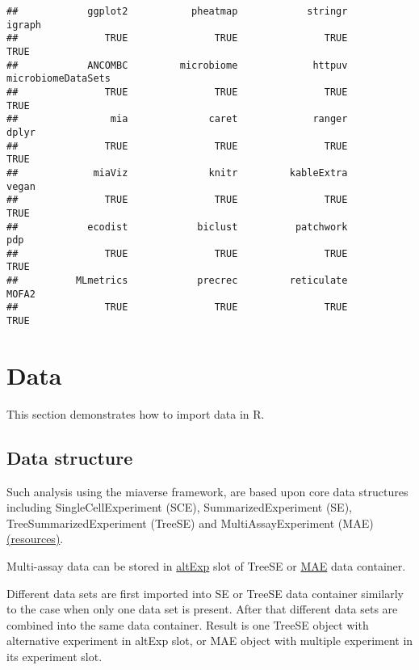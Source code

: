 \documentclass[
  oneside]{book}
\begin{document}
\begin{verbatim}
##            ggplot2           pheatmap            stringr             igraph 
##               TRUE               TRUE               TRUE               TRUE 
##            ANCOMBC         microbiome             httpuv microbiomeDataSets 
##               TRUE               TRUE               TRUE               TRUE 
##                mia              caret             ranger              dplyr 
##               TRUE               TRUE               TRUE               TRUE 
##             miaViz              knitr         kableExtra              vegan 
##               TRUE               TRUE               TRUE               TRUE 
##            ecodist            biclust          patchwork                pdp 
##               TRUE               TRUE               TRUE               TRUE 
##          MLmetrics            precrec         reticulate              MOFA2 
##               TRUE               TRUE               TRUE               TRUE
\end{verbatim}

\hypertarget{data}{%
\chapter{Data}\label{data}}

This section demonstrates how to import data in R.

\hypertarget{data-structure}{%
\section{Data structure}\label{data-structure}}

Such analysis using the miaverse framework, are based upon core data structures
including SingleCellExperiment (SCE), SummarizedExperiment (SE), TreeSummarizedExperiment (TreeSE) and MultiAssayExperiment (MAE) \href{https://microbiome.github.io/course_2022_miaverse/study-material.html\#resources-for-treesummarizedexperiment}{(resources)}.

Multi-assay data can be stored in \href{https://microbiome.github.io/OMA/containers.html\#alternative-experiments}{altExp}
slot of TreeSE or \href{https://microbiome.github.io/OMA/containers.html\#multiassayexperiments}{MAE} data container.

Different data sets are first imported into SE or TreeSE data container similarly to the case when only one data set is present. After that different data sets are combined into the same data container. Result is one TreeSE object with alternative experiment in altExp slot, or MAE object with multiple experiment in its experiment slot.
\end{document}
